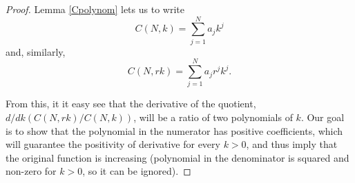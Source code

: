 \begin{proof}
Lemma \ref{Cpolynom} lets us to write
\begin{equation}\label{C1}
C(N,k) = \sum_{j=1}^{N} a_j k^j
\end{equation}and, similarly,
\begin{equation}\label{C2}
C(N,rk) = \sum_{j=1}^{N} a_j  r^jk^j.
\end{equation}

From this, it it easy see that the derivative of the quotient, \\ $d/dk (C(N,rk)/C(N,k))$, will be a ratio of two polynomials of $k$. Our goal is to show that the polynomial in the numerator has positive coefficients, which will guarantee the positivity of derivative for every $k > 0$, and thus imply that the original function is increasing (polynomial in the denominator is squared and non-zero for $k > 0$, so it can be ignored).  


\end{proof}
